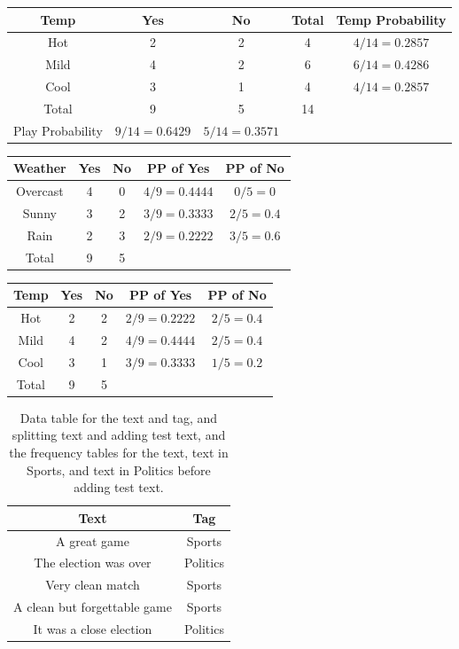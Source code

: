 \documentclass[12pt,twoside]{report}   %
\begin{document}
\begin{table}[H]
  \centering
  \begin{tabular}{|c|c|c|c|c|}
    \hline
    Temp & Yes & No & Total & Temp Probability\\
\hline
Hot & 2 & 2 & 4 & $4/14=0.2857$\\
Mild & 4 & 2 & 6 & $6/14=0.4286$\\ 
Cool & 3 & 1 & 4 & $4/14=0.2857$\\
\hline
Total & 9 & 5 & 14 &\\
\hline
Play Probability & $9/14=0.6429$ & $5/14=0.3571$ &&\\
    \hline
  \end{tabular}
\end{table}
\begin{table}[H]
  \centering
  \begin{tabular}{|c|c|c|c|c|}
    \hline
    Weather & Yes & No & PP of Yes & PP of No\\
\hline
Overcast & 4 & 0 & $4/9=0.4444$ & $0/5=0$\\
Sunny & 3 & 2 & $3/9=0.3333$ & $2/5=0.4$\\ 
Rain & 2 & 3 & $2/9=0.2222$ & $3/5=0.6$\\
\hline
Total & 9 & 5 &&\\
    \hline
  \end{tabular}
\end{table}
\begin{table}[H]
  \centering
  \begin{tabular}{|c|c|c|c|c|}
    \hline
    Temp & Yes & No & PP of Yes & PP of No\\
\hline
Hot & 2 & 2 & $2/9=0.2222$ & $2/5=0.4$\\
Mild & 4 & 2 & $4/9=0.4444$ & $2/5=0.4$\\ 
Cool & 3 & 1 & $3/9=0.3333$ & $1/5=0.2$\\
\hline
Total & 9 & 5 &&\\
    \hline
  \end{tabular}
\end{table}
\begin{table}[H]
  \centering
  \caption{Data table for the text and tag, and splitting text and adding test text, and the frequency tables for the text, text in Sports, and text in Politics before adding test text.}
  \label{tab:text}
  \begin{tabular}{|c|c|}
    \hline
    Text & Tag\\
\hline
A great game & Sports\\
The election was over & Politics\\ 
Very clean match & Sports\\
A clean but forgettable game & Sports\\
It was a close election & Politics\\
\hline
  \end{tabular}
\end{table}
\end{document}
